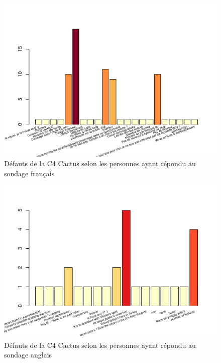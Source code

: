 \documentclass[12pt]{article}\usepackage[]{graphicx}\usepackage[]{color}
\makeatletter
\def\maxwidth{ %
  \ifdim\Gin@nat@width>\linewidth
    \linewidth
  \else
    \Gin@nat@width
  \fi
}
\newenvironment{knitrout}{}{} %
\makeatother
\begin{document}
\begin{knitrout}
\color{fgcolor}\begin{figure}[H]
\includegraphics[width=\maxwidth]{figure/flaws_fr-1} \caption[Défauts de la C4 Cactus selon les personnes ayant répondu au sondage français]{Défauts de la C4 Cactus selon les personnes ayant répondu au sondage français}\label{fig:flaws fr}
\end{figure}


\end{knitrout}

\begin{knitrout}
\color{fgcolor}\begin{figure}[H]
\includegraphics[width=\maxwidth]{figure/flaws_en-1} \caption[Défauts de la C4 Cactus selon les personnes ayant répondu au sondage anglais]{Défauts de la C4 Cactus selon les personnes ayant répondu au sondage anglais}\label{fig:flaws en}
\end{figure}


\end{knitrout}
\end{document}
